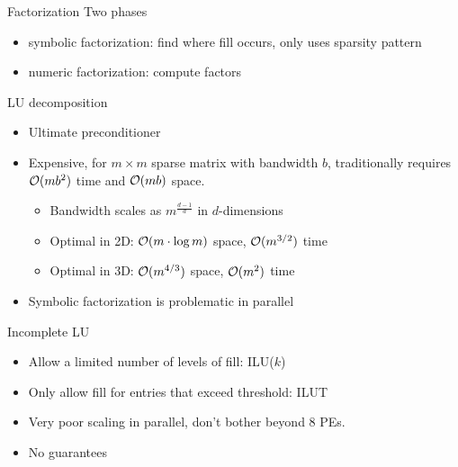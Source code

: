 \begin{frame}[shrink=5]{Factorization}
  Two phases
  \begin{itemize}
  \item symbolic factorization: find where fill occurs, only uses sparsity pattern
  \item numeric factorization: compute factors
  \end{itemize}
  \begin{block}{LU decomposition}
    \begin{itemize}
    \item Ultimate preconditioner
    \item Expensive, for $m\times m$ sparse matrix with bandwidth $b$, traditionally requires $\mathcal{O}(mb^2)$ time and $\mathcal{O}(mb)$ space.
      \begin{itemize}
      \item Bandwidth scales as $m^{\frac{d-1}{d}}$ in $d$-dimensions
      \item Optimal in 2D: $\mathcal{O}(m \cdot \log m)$ space, $\mathcal{O}(m^{3/2})$ time
      \item Optimal in 3D: $\mathcal{O}(m^{4/3})$ space, $\mathcal{O}(m^2)$ time
      \end{itemize}
    \item Symbolic factorization is problematic in parallel
    \end{itemize}
  \end{block}
  \begin{block}{Incomplete LU}
    \begin{itemize}
    \item Allow a limited number of levels of fill:
      ILU($k$)
    \item Only allow fill for entries that exceed threshold: ILUT
    \item Very poor scaling in parallel, don't bother beyond 8 PEs.
    \item No guarantees
    \end{itemize}
  \end{block}
\end{frame}

